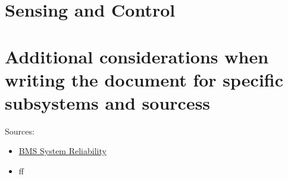\section{Sensing and Control}


\section{Additional considerations when writing the document for specific subsystems and sourcess}
Sources:
\begin{itemize}
    \item \href{https://link.springer.com/article/10.1007/s40789-022-00494-0}{BMS System Reliability}
    \item ff
\end{itemize}

\newpage